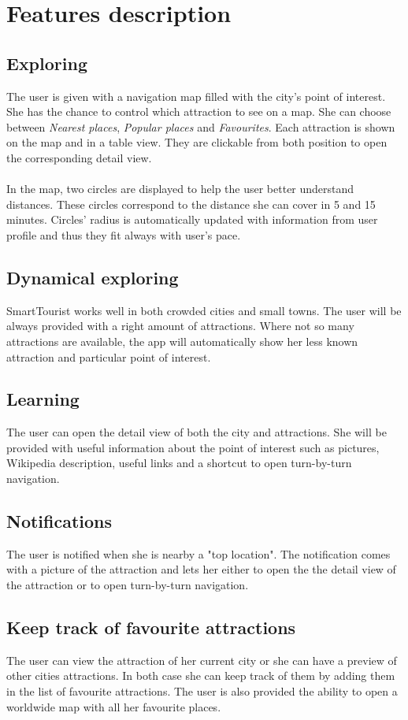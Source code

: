 \documentclass[a4paper, 11pt, parskip=half]{scrreprt}
\theoremstyle{definition}
\begin{document}
 \section{Features description}
 \subsection{Exploring}
 The user is given with a navigation map filled with the city's point of interest. She has the chance to control which attraction to see on a map. She can choose between \textit{Nearest places}, \textit{Popular places} and \textit{Favourites}. Each attraction is shown on the map and in a table view. They are clickable from both position to open  the corresponding detail view.
 \\\\In the map, two circles are displayed to help the user better understand distances. These circles correspond to the distance she can cover in 5 and 15 minutes. Circles' radius is automatically updated with information from user profile and thus they fit always with user's pace.
 
 \subsection{Dynamical exploring}
 SmartTourist works well in both crowded cities and small towns. The user will be always provided with a right amount of attractions. Where not so many attractions are available, the app will automatically show her less known attraction and particular point of interest.
 
 \subsection{Learning}
 The user can open the detail view of both the city and attractions. She will be provided with useful information about the point of interest such as pictures, Wikipedia description, useful links and a shortcut to open turn-by-turn navigation.
 
 \subsection{Notifications}
 The user is notified when she is nearby a "top location". The notification comes with a picture of the attraction and lets her either to open the the detail view of the attraction or to open turn-by-turn navigation. 
 
 \subsection{Keep track of favourite attractions}
 The user can view the attraction of her current city or she can have a preview of other cities attractions. In both case she can keep track of them by adding them in the list of favourite attractions. The user is also provided the ability to open a worldwide map with all her favourite places.
\end{document}
